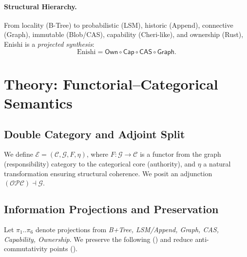 \documentclass[10pt]{article}
\begin{document}
\paragraph{Structural Hierarchy.}
From locality (B-Tree) to probabilistic (LSM), historic (Append), connective (Graph),
immutable (Blob/CAS), capability (Cheri-like), and ownership (Rust), Enishi is a \emph{projected synthesis}:
\[
\text{Enishi} = \mathsf{Own} \circ \mathsf{Cap} \circ \mathsf{CAS} \circ \mathsf{Graph}.
\]

\section{Theory: Functorial--Categorical Semantics}
\subsection{Double Category and Adjoint Split}
We define $\mathcal{E} = (\mathcal{C},\mathcal{G},F,\eta)$, where
$F:\mathcal{G}\to\mathcal{C}$ is a functor from the graph (responsibility) category to the categorical core (authority),
and $\eta$ a natural transformation ensuring structural coherence. We posit an adjunction
$(\mathcal{O}\mathcal{P}\mathcal{C}) \dashv \mathcal{G}$.

\subsection{Information Projections and Preservation}
Let $\pi_1.. \pi_6$ denote projections from \emph{B+Tree, LSM/Append, Graph, CAS, Capability, Ownership}.
We preserve the following () and reduce anti-commutativity points ().
\end{document}
